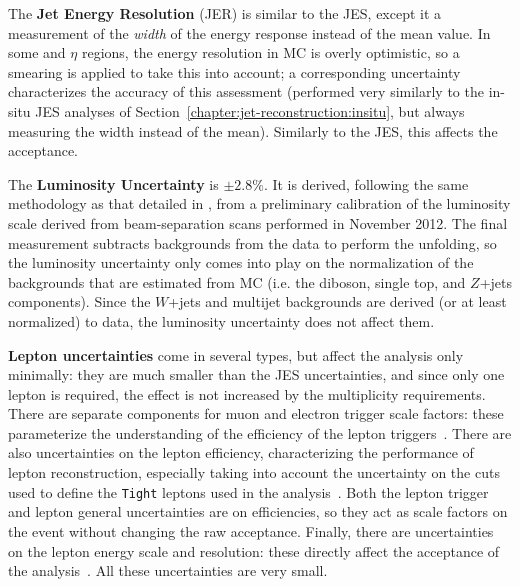 	The \textbf{Jet Energy Resolution} (JER) is similar to the JES, except it a measurement of the \textit{width} of the energy response instead of the mean value. In some \pt and $\eta$ regions, the energy resolution in MC is overly optimistic, so a smearing is applied to take this into account; a corresponding uncertainty characterizes the accuracy of this assessment (performed very similarly to the in-situ JES analyses of Section~\ref{chapter:jet-reconstruction:insitu}, but always measuring the width instead of the mean). Similarly to the JES, this affects the acceptance.%


	The \textbf{Luminosity Uncertainty} is $\pm2.8\%$. It is derived, following the same methodology as that detailed in \cite{ATLASLumi}, from a preliminary calibration of the luminosity scale derived from beam-separation scans performed in November 2012. The final measurement subtracts backgrounds from the data to perform the unfolding, so the luminosity uncertainty only comes into play on the normalization of the backgrounds that are estimated from MC (i.e. the diboson, single top, and $Z$+jets components). Since the $W$+jets and multijet backgrounds are derived (or at least normalized) to data, the luminosity uncertainty does not affect them.

	\textbf{Lepton uncertainties} come in several types, but affect the analysis only minimally: they are much smaller than the JES uncertainties, and since only one lepton is required, the effect is not increased by the multiplicity requirements. There are separate components for muon and electron trigger scale factors: these parameterize the understanding of the efficiency of the lepton triggers~\cite{Pasztor:1706278,ATLAS-CONF-2012-099}. There are also uncertainties on the lepton efficiency, characterizing the performance of lepton reconstruction, especially taking into account the uncertainty on the cuts used to define the \texttt{Tight} leptons used in the analysis~\cite{Aad:2014fxa,ATLAS-CONF-2014-032,Aad:2014rra}. Both the lepton trigger and lepton general uncertainties are on efficiencies, so they act as scale factors on the event without changing the raw acceptance. Finally, there are uncertainties on the lepton energy scale and resolution: these directly affect the acceptance of the analysis~\cite{Aad:2014nim,Aad:2014rra}. All these uncertainties are very small.

